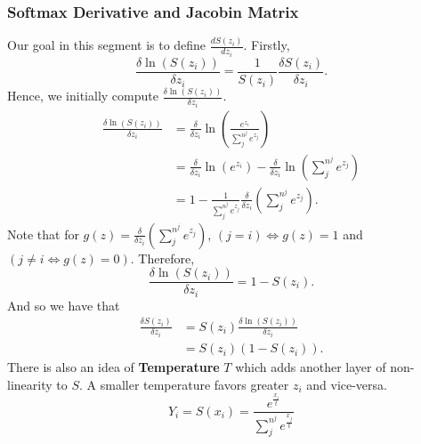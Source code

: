 \documentclass[11pt,letterpaper]{amsbook}
\theoremstyle{definition}
\numberwithin{definition}{chapter}
\numberwithin{exercise}{chapter}
\numberwithin{section}{chapter}
\newcommand{\ds}{\displaystyle}
\begin{document}
\subsubsection{Softmax Derivative and Jacobin Matrix}
Our goal in this segment is to define $\ds \frac{d S(z_i)}{d z_i}$. Firstly, \begin{equation}
    \frac{\delta \ln(S(z_i))}{\delta z_i} = \frac{1}{S(z_i)} \frac{\delta S(z_i)}{\delta z_i}.
\end{equation}
Hence, we initially compute $\ds \frac{\delta \ln(S(z_i))}{\delta z_i}$.\begin{align}
    \frac{\delta \ln(S(z_i))}{\delta z_i} &= \frac{\delta }{\delta z_i} \ln(\frac{e^{z_i}}{\sum^{n^j}_{j} e^{z_j}}) \\
    &= \frac{\delta }{\delta z_i} \ln (e^{z_i}) - \frac{\delta }{\delta z_i}\ln(\sum^{n^j}_{j} e^{z_j}) \\
    &= 1 - \frac{1}{\sum^{n^j}_{j} e^{z_j}} \frac{\delta }{\delta z_i}(\sum^{n^j}_{j} e^{z_j}).
\end{align}
Note that for $g(z) = \ds \frac{\delta }{\delta z_i}(\sum^{n^j}_{j} e^{z_j})$, $(j = i) \iff g(z) = 1 $ and $(j \neq i \iff g(z) = 0)$. Therefore, \begin{equation}
  \frac{\delta \ln(S(z_i))}{\delta z_i} =  1 - S(z_i).
\end{equation}
And so we have that \begin{align}
    \frac{\delta S(z_i)}{\delta z_i} &= S(z_i) \frac{\delta \ln(S(z_i))}{\delta z_i} \\
    &= S(z_i) (1 - S(z_i)).
\end{align}
There is also an idea of \textbf{Temperature} $T$ which adds another layer of non-linearity to $S$. A smaller temperature favors greater $z_i$ and vice-versa.
\begin{equation}
     Y_i = S(x_i) = \frac{e^\frac{x_i}{t}}{\sum^{n^j}_{j} e^\frac{x_j}{t}}
\end{equation}
\vspace{2em}
\end{document}
